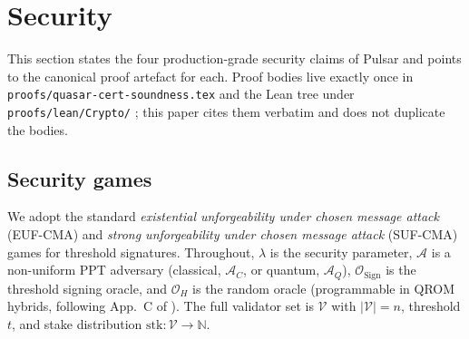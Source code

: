 \section{Security}
\label{sec:security}

This section states the four production-grade security claims of Pulsar
and points to the canonical proof artefact for each. Proof bodies live
exactly once in \texttt{proofs/quasar-cert-soundness.tex}
\cite{quasarcertsoundness} and the Lean tree under
\texttt{proofs/lean/Crypto/} \cite{leancrypto}; this paper cites them
verbatim and does not duplicate the bodies.

\subsection{Security games}
\label{sec:security:games}

We adopt the standard \emph{existential unforgeability under chosen
message attack} (EUF-CMA) and \emph{strong unforgeability under chosen
message attack} (SUF-CMA) games for threshold signatures. Throughout,
$\lambda$ is the security parameter, $\mathcal{A}$ is a non-uniform
PPT adversary (classical, $\mathcal{A}_C$, or quantum, $\mathcal{A}_Q$),
$\mathcal{O}_{\mathrm{Sign}}$ is the threshold signing oracle, and
$\mathcal{O}_H$ is the random oracle (programmable in QROM hybrids,
following App.~C of \cite{quasarcertsoundness}). The full validator
set is $\mathcal{V}$ with $|\mathcal{V}| = n$, threshold $t$, and stake
distribution $\mathrm{stk}: \mathcal{V} \to \mathbb{N}$.


